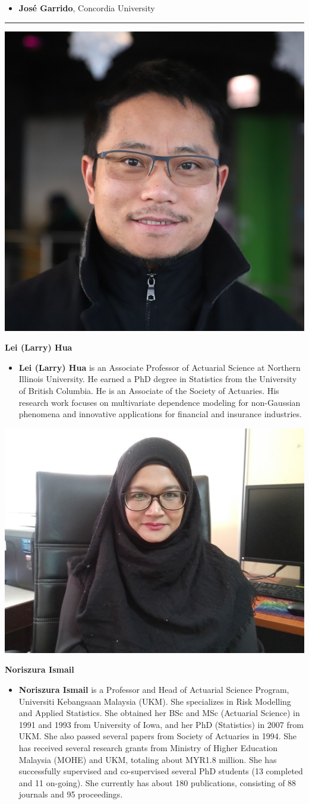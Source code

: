 \documentclass[
  12pt,
  krantz2]{Format/krantzNoCorner}
\providecommand{\tightlist}{%
  \setlength{\itemsep}{0pt}\setlength{\parskip}{0pt}}
\begin{document}
\begin{itemize}
\tightlist
\item
  \textbf{José Garrido}, Concordia University
\end{itemize}

\begin{center}\rule{0.5\linewidth}{0.5pt}\end{center}

\begin{center}\includegraphics[width=0.2\linewidth,height=0.3\textheight]{ContributorPics/Larry2018} \end{center}

\begin{center}
\textbf{ Lei (Larry) Hua }
\end{center}

\begin{itemize}
\tightlist
\item
  \textbf{Lei (Larry) Hua} is an Associate Professor of Actuarial Science at Northern Illinois University. He earned a PhD degree in Statistics from the University of British Columbia. He is an Associate of the Society of Actuaries. His research work focuses on multivariate dependence modeling for non-Gaussian phenomena and innovative applications for financial and insurance industries.
\end{itemize}

\begin{center}\includegraphics[width=0.2\linewidth,height=0.3\textheight]{ContributorPics/Noriszura} \end{center}

\begin{center}
\textbf{ Noriszura Ismail }
\end{center}

\begin{itemize}
\tightlist
\item
  \textbf{Noriszura Ismail} is a Professor and Head of Actuarial Science Program, Universiti Kebangsaan Malaysia (UKM). She specializes in Risk Modelling and Applied Statistics. She obtained her BSc and MSc (Actuarial Science) in 1991 and 1993 from University of Iowa, and her PhD (Statistics) in 2007 from UKM. She also passed several papers from Society of Actuaries in 1994. She has received several research grants from Ministry of Higher Education Malaysia (MOHE) and UKM, totaling about MYR1.8 million. She has successfully supervised and co-supervised several PhD students (13 completed and 11 on-going). She currently has about 180 publications, consisting of 88 journals and 95 proceedings.
\end{itemize}
\end{document}
